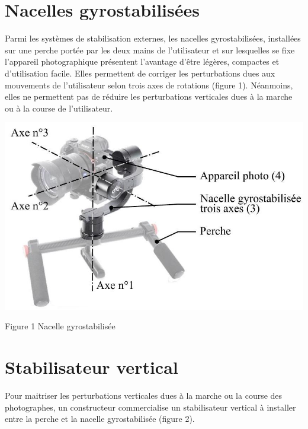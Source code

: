 \documentclass[10pt]{article}
\begin{document}
\section{Nacelles gyrostabilisées}
Parmi les systèmes de stabilisation externes, les nacelles gyrostabilisées, installées sur une perche portée par les deux mains de l'utilisateur et sur lesquelles se fixe l'appareil photographique présentent l'avantage d'être légères, compactes et d'utilisation facile. Elles permettent de corriger les perturbations dues aux mouvements de l'utilisateur selon trois axes de rotations (figure 1). Néanmoins, elles ne permettent pas de réduire les perturbations verticales dues à la marche ou à la course de l'utilisateur.

\begin{center}
\includegraphics[max width=\textwidth]{2022_12_31_ed674c1a831ea1bff3a0g-01(1)}
\end{center}

Figure 1 Nacelle gyrostabilisée

\section{Stabilisateur vertical}
Pour maitriser les perturbations verticales dues à la marche ou la course des photographes, un constructeur commercialise un stabilisateur vertical à installer entre la perche et la nacelle gyrostabilisée (figure 2).
\end{document}
